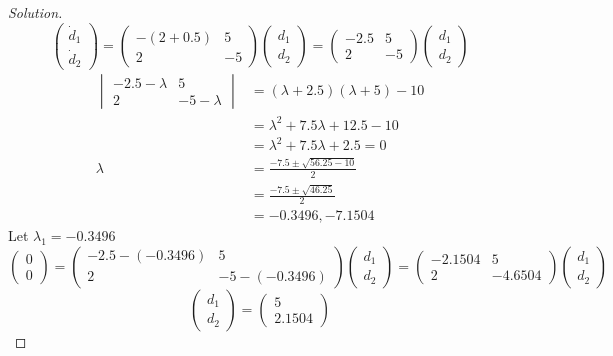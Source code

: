 \documentclass[12pt]{article}
\begin{document}
\begin{proof}[Solution]
	$$
	\begin{pmatrix}
		\dot{d}_1 \\
		\dot{d}_2
	\end{pmatrix} = 
	\begin{pmatrix}
		-(2 + 0.5) & 5 \\
		2 &  -5
	\end{pmatrix} 
	\begin{pmatrix}
		d_1 \\
		d_2
	\end{pmatrix} = 
	\begin{pmatrix}
		-2.5 & 5 \\
		2 &  -5
	\end{pmatrix} 
	\begin{pmatrix}
		d_1 \\
		d_2
	\end{pmatrix}
	$$
	\begin{align*}
		\begin{vmatrix}
			-2.5 - \lambda & 5 \\
			2 &  -5 - \lambda
		\end{vmatrix} &= (\lambda + 2.5)(\lambda + 5) -10 \\
		&= \lambda^2 + 7.5\lambda + 12.5 - 10 \\
		&= \lambda^2 + 7.5\lambda + 2.5 = 0\\
		\lambda &= \frac{-7.5 \pm \sqrt{56.25 - 10}}{2} \\
		&= \frac{-7.5 \pm \sqrt{46.25}}{2} \\
		&= -0.3496, -7.1504 
	\end{align*}
	Let $\lambda_1 = -0.3496$
		$$
		\begin{pmatrix}
			0 \\
			0
		\end{pmatrix} = 
		\begin{pmatrix}
			-2.5 - (-0.3496) & 5 \\
			2 & -5 - (-0.3496)
		\end{pmatrix}
		\begin{pmatrix}
			d_1 \\
			d_2
		\end{pmatrix} = 
		\begin{pmatrix}
			-2.1504 & 5 \\
			2 & -4.6504
		\end{pmatrix}
		\begin{pmatrix}
			d_1 \\
			d_2
		\end{pmatrix} 
		$$
		$$
		\begin{pmatrix}
			d_1 \\
			d_2
		\end{pmatrix} = 
		\begin{pmatrix}
			5 \\
			2.1504
		\end{pmatrix}
		$$
		

\end{proof}
\end{document}
